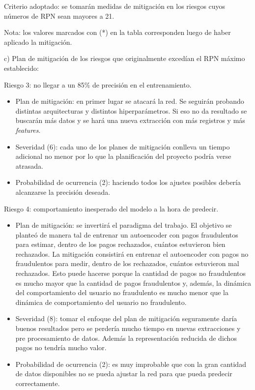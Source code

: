 \documentclass[
11pt, %
]{charter}
\begin{document}
Criterio adoptado: se tomarán medidas de mitigación en los riesgos cuyos números de RPN sean mayores a 21.

Nota: los valores marcados con (*) en la tabla corresponden luego de haber aplicado la mitigación.


c) Plan de mitigación de los riesgos que originalmente excedían el RPN máximo establecido:
 
Riesgo 3: no llegar a un 85\% de precisión en el entrenamiento.
\begin{itemize}
	\item Plan de mitigación: en primer lugar se atacará la red. Se seguirán probando distintas arquitecturas y distintos hiperparámetros. Si eso no da resultado se buscarán más datos y se hará una nueva extracción con más registros y más \emph{features}.
	\item Severidad (6): cada uno de los planes de mitigación conlleva un tiempo adicional no menor por lo que la planificación del proyecto podría verse atrasada.
	\item Probabilidad de ocurrencia (2): haciendo todos los ajustes posibles debería alcanzarse la precisión deseada.
\end{itemize}

Riesgo 4: comportamiento inesperado del modelo a la hora de predecir. 
\begin{itemize}
	\item Plan de mitigación: se invertirá el paradigma del trabajo. El objetivo se planteó de manera tal de entrenar un autoencoder con pagos fraudulentos para estimar, dentro de los pagos rechazados, cuántos estuvieron bien rechazados. La mitigación consistirá en entrenar el autoencoder con pagos no fraudulentos para medir, dentro de los rechazados, cuántos estuvieron mal rechazados. Esto puede hacerse porque la cantidad de pagos no fraudulentos es mucho mayor que la cantidad de pagos fraudulentos y, además, la dinámica del comportamiento del usuario no fraudulento es mucho menor que la dinámica de comportamiento del usuario no fraudulento.
	\item Severidad (8): tomar el enfoque del plan de mitigación seguramente daría buenos resultados pero se perdería mucho tiempo en nuevas extracciones y pre procesamiento de datos. Además la representación reducida de dichos pagos no tendría mucho valor.
	\item Probabilidad de ocurrencia (2): es muy improbable que con la gran cantidad de datos disponibles no se pueda ajustar la red para que pueda predecir correctamente.
\end{itemize}
\end{document}
